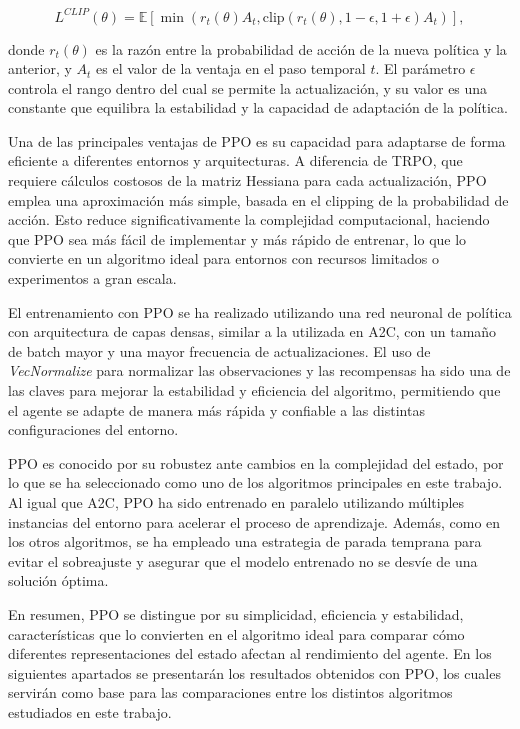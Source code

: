 \begin{equation}
L^{CLIP}(\theta) = \mathbb{E}\left[\min\left(r_t(\theta)A_t, \text{clip}(r_t(\theta), 1 - \epsilon, 1 + \epsilon)A_t\right)\right],
\end{equation}

donde $r_t(\theta)$ es la razón entre la probabilidad de acción de la nueva política y la anterior, y $A_t$ es el valor de la ventaja en el paso temporal $t$. El parámetro $\epsilon$ controla el rango dentro del cual se permite la actualización, y su valor es una constante que equilibra la estabilidad y la capacidad de adaptación de la política.

Una de las principales ventajas de PPO es su capacidad para adaptarse de forma eficiente a diferentes entornos y arquitecturas. A diferencia de TRPO, que requiere cálculos costosos de la matriz Hessiana para cada actualización, PPO emplea una aproximación más simple, basada en el clipping de la probabilidad de acción. Esto reduce significativamente la complejidad computacional, haciendo que PPO sea más fácil de implementar y más rápido de entrenar, lo que lo convierte en un algoritmo ideal para entornos con recursos limitados o experimentos a gran escala.

El entrenamiento con PPO se ha realizado utilizando una red neuronal de política con arquitectura de capas densas, similar a la utilizada en A2C, con un tamaño de batch mayor y una mayor frecuencia de actualizaciones. El uso de \textit{VecNormalize} para normalizar las observaciones y las recompensas ha sido una de las claves para mejorar la estabilidad y eficiencia del algoritmo, permitiendo que el agente se adapte de manera más rápida y confiable a las distintas configuraciones del entorno.

PPO es conocido por su robustez ante cambios en la complejidad del estado, por lo que se ha seleccionado como uno de los algoritmos principales en este trabajo. Al igual que A2C, PPO ha sido entrenado en paralelo utilizando múltiples instancias del entorno para acelerar el proceso de aprendizaje. Además, como en los otros algoritmos, se ha empleado una estrategia de parada temprana para evitar el sobreajuste y asegurar que el modelo entrenado no se desvíe de una solución óptima.

En resumen, PPO se distingue por su simplicidad, eficiencia y estabilidad, características que lo convierten en el algoritmo ideal para comparar cómo diferentes representaciones del estado afectan al rendimiento del agente. En los siguientes apartados se presentarán los resultados obtenidos con PPO, los cuales servirán como base para las comparaciones entre los distintos algoritmos estudiados en este trabajo.

